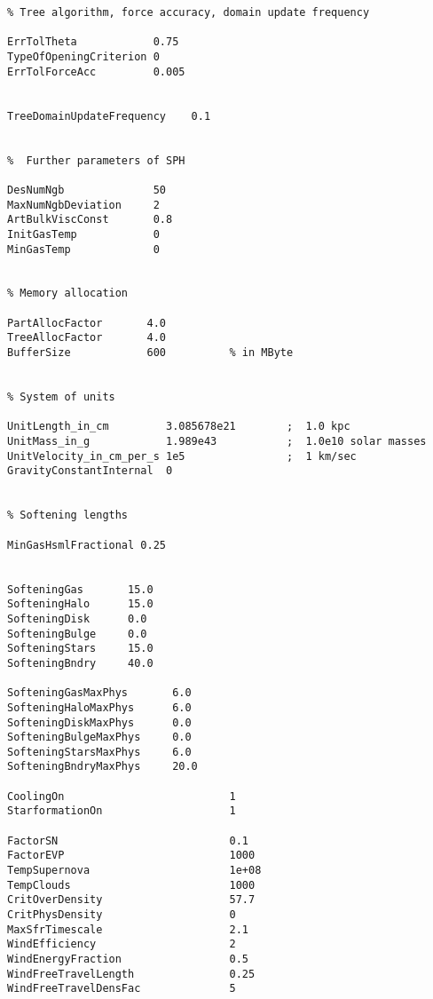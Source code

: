 \documentclass[a4paper,english,10.5pt]{scrartcl}
\begin{document}
\begin{verbatim}
% Tree algorithm, force accuracy, domain update frequency

ErrTolTheta            0.75            
TypeOfOpeningCriterion 0
ErrTolForceAcc         0.005


TreeDomainUpdateFrequency    0.1


%  Further parameters of SPH

DesNumNgb              50
MaxNumNgbDeviation     2
ArtBulkViscConst       0.8
InitGasTemp            0
MinGasTemp             0


% Memory allocation

PartAllocFactor       4.0
TreeAllocFactor       4.0
BufferSize            600          % in MByte


% System of units

UnitLength_in_cm         3.085678e21        ;  1.0 kpc 
UnitMass_in_g            1.989e43           ;  1.0e10 solar masses 
UnitVelocity_in_cm_per_s 1e5                ;  1 km/sec 
GravityConstantInternal  0
 

% Softening lengths

MinGasHsmlFractional 0.25


SofteningGas       15.0
SofteningHalo      15.0
SofteningDisk      0.0
SofteningBulge     0.0           
SofteningStars     15.0
SofteningBndry     40.0

SofteningGasMaxPhys       6.0
SofteningHaloMaxPhys      6.0
SofteningDiskMaxPhys      0.0
SofteningBulgeMaxPhys     0.0           
SofteningStarsMaxPhys     6.0
SofteningBndryMaxPhys     20.0

CoolingOn                          1
StarformationOn                    1

FactorSN                           0.1
FactorEVP                          1000
TempSupernova                      1e+08
TempClouds                         1000
CritOverDensity                    57.7
CritPhysDensity                    0
MaxSfrTimescale                    2.1
WindEfficiency                     2
WindEnergyFraction                 0.5
WindFreeTravelLength               0.25
WindFreeTravelDensFac              5

\end{verbatim}
\end{document}
